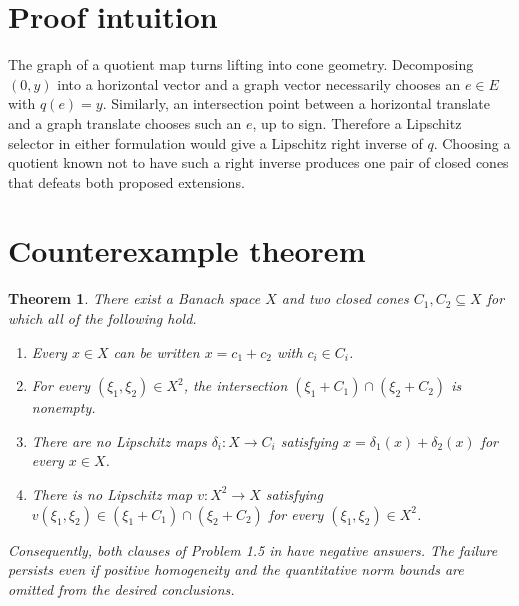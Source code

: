 \documentclass[11pt]{article}
\newtheorem{theorem}{Theorem}
\begin{document}
\section{Proof intuition}

The graph of a quotient map turns lifting into cone geometry.  Decomposing
$(0,y)$ into a horizontal vector and a graph vector necessarily chooses an
$e\in E$ with $q(e)=y$.  Similarly, an intersection point between a horizontal
translate and a graph translate chooses such an $e$, up to sign.  Therefore a
Lipschitz selector in either formulation would give a Lipschitz right inverse
of $q$.  Choosing a quotient known not to have such a right inverse produces
one pair of closed cones that defeats both proposed extensions.

\section{Counterexample theorem}

\begin{theorem}\label{thm:main}
There exist a Banach space $X$ and two closed cones $C_1,C_2\subseteq X$ for
which all of the following hold.
\begin{enumerate}
  \item Every $x\in X$ can be written $x=c_1+c_2$ with $c_i\in C_i$.
  \item For every $(\xi_1,\xi_2)\in X^2$, the intersection
  $(\xi_1+C_1)\cap(\xi_2+C_2)$ is nonempty.
  \item There are no Lipschitz maps $\delta_i:X\to C_i$ satisfying
  $x=\delta_1(x)+\delta_2(x)$ for every $x\in X$.
  \item There is no Lipschitz map $v:X^2\to X$ satisfying
  $v(\xi_1,\xi_2)\in(\xi_1+C_1)\cap(\xi_2+C_2)$ for every
  $(\xi_1,\xi_2)\in X^2$.
\end{enumerate}
Consequently, both clauses of Problem 1.5 in \cite{source} have negative
answers.  The failure persists even if positive homogeneity and the
quantitative norm bounds are omitted from the desired conclusions.
\end{theorem}
\end{document}
